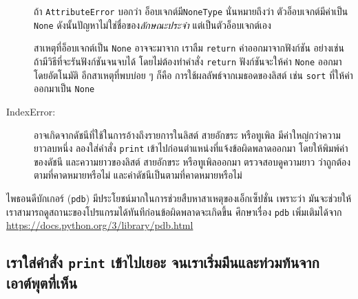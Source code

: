 \begin{description}
ถ้า \texttt{AttributeError}
บอกว่า
อ็อบเจกต์มี\texttt{NoneType}
นั่นหมายถึงว่า ตัวอ็อบเจกต์มีค่าเป็น \texttt{None}  
ดังนั้นปัญหาไม่ใช่ชื่อของ\textit{ลักษณะประจำ} แต่เป็นตัวอ็อบเจกต์เอง

สาเหตุที่อ็อบเจกต์เป็น \texttt{None}
อาจจะมาจาก เราลืม \texttt{return} ค่าออกมาจากฟังก์ชัน
อย่างเช่น ถ้ามีวิธีที่จะรันฟังก์ชันจนจบได้ โดยไม่ต้องทำคำสั่ง \texttt{return}
ฟังก์ชันจะให้ค่า \texttt{None} ออกมาโดยอัตโนมัติ
อีกสาเหตุที่พบบ่อย ๆ ก็คือ การใช้ผลลัพธ์จากเมธอดของลิสต์ เช่น \texttt{sort} ที่ให้ค่าออกมาเป็น \texttt{None}

\item[IndexError:] %
อาจเกิดจากดัชนีที่ใช้ในการอ้างถึงรายการในลิสต์ สายอักขระ หรือทูเพิล มีค่าใหญ่กว่าความยาวลบหนึ่ง
ลองใส่คำสั่ง \texttt{print} เข้าไปก่อนตำแหน่งที่แจ้งข้อผิดพลาดออกมา
โดยให้พิมพ์ค่าของดัชนี และความยาวของลิสต์ สายอักขระ หรือทูเพิลออกมา
ตรวจสอบดูความยาว ว่าถูกต้องตามที่คาดหมายหรือไม่
และค่าดัชนีเป็นตามที่คาดหมายหรือไม่

\end{description}


ไพธอนดีบักเกอร์ (\texttt{pdb}) 
มีประโยชน์มากในการช่วยสืบหาสาเหตุของเอ็กเซ็ปชั่น
เพราะว่า มันจะช่วยให้เราสามารถดูสถานะของโปรแกรมได้ทันทีก่อนข้อผิดพลาดจะเกิดขึ้น
ศึกษาเรื่อง \texttt{pdb} เพิ่มเติมได้จาก \url{https://docs.python.org/3/library/pdb.html}

\subsection{เราใส่คำสั่ง \texttt{print} เข้าไปเยอะ จนเราเริ่มมึนและท่วมท้นจากเอาต์พุตที่เห็น}

